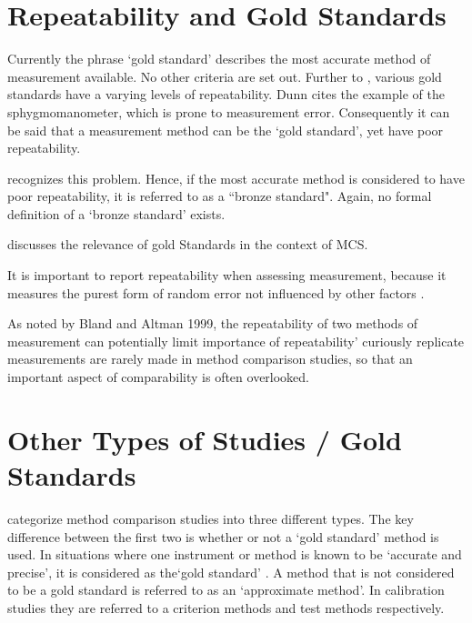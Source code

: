 \documentclass[12pt, a4paper]{report}
\theoremstyle{plain}
\theoremstyle{definition}
\theoremstyle{remark}
\begin{document}
	
	
		\section{Repeatability and Gold Standards}
		Currently the phrase `gold standard' describes the most accurate method of measurement available. No other criteria are set out. Further to \citet{dunnSEME}, various gold standards have a varying levels of repeatability. Dunn cites the example of the sphygmomanometer, which is prone to measurement error. Consequently it can be said that a measurement method can be the `gold standard', yet have poor repeatability. 
		
		\citet{dunnSEME} recognizes  this problem. Hence, if the most accurate method is considered to have poor repeatability, it is referred to as a ``bronze standard".  Again, no formal definition of a `bronze standard' exists.
		
		

\citet{ARoy2015} discusses the relevance of gold Standards in the context of MCS.


		
	
	It is important to report repeatability when assessing measurement, because it measures the purest form of random error not influenced by other factors \citep{Barnhart}.	
	

	As noted by Bland and Altman 1999, the repeatability of two methods of measurement can  potentially limit	importance of repeatability' curiously replicate measurements are rarely made in method comparison studies, so that an important aspect of comparability is often overlooked.
	

	
	


		
		

	\section{Other Types of Studies / Gold Standards}
	\citet{lewis} categorize method comparison studies into three
	different types.  The key difference between the first two is
	whether or not a `gold standard' method is used. In situations
	where one instrument or method is known to be `accurate and
	precise', it is considered as the`gold standard' \citep{lewis}. A
	method that is not considered to be a gold standard is referred to
	as an `approximate method'. In calibration studies they are
	referred to a criterion methods and test methods respectively.
	
\end{document}
